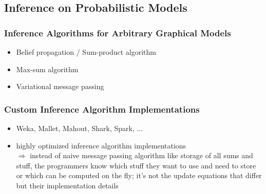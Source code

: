 \subsection{Inference on Probabilistic Models}
\label{subsec:inference}

\subsubsection{Inference Algorithms for Arbitrary Graphical Models}

\begin{itemize}
\item Belief propagation / Sum-product algorithm
\item Max-sum algorithm
\item Variational message passing
\end{itemize}

\subsubsection{Custom Inference Algorithm Implementations}
\label{subsec:custom-inference}

\begin{itemize}
\item Weka, Mallet, Mahout, Shark, Spark, ...
\item highly optimized inference algorithm implementations\\
$\Rightarrow$ instead of naive message passing algorithm like storage of all sums and stuff, the programmers know which stuff they want to use and need to store or which can be computed on the fly; it's not the update equations that differ but their implementation details
\end{itemize}

